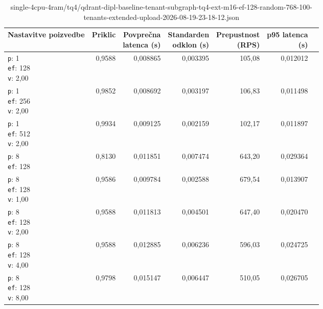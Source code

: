 \begin{table}[htbp]
  \centering
\small
  \caption{single-4cpu-4ram/tq4/qdrant-dipl-baseline-tenant-subgraph-tq4-ext-m16-ef-128-random-768-100-tenants-extended-upload-2026-08-19-23-18-12.json}
  \label{tab:single-4cpu-4ram:tq4:qdrant-dipl-baseline-tenant-subgraph-tq4-ext-m16-ef-128-random-768-100-tenants-extended-upload-2026-08-19-23-18-12.json}
  \begin{tabularx}{\textwidth}{Xrrrrrr}
    \toprule
    Nastavitve poizvedbe & Priklic & \makecell{Povprečna\\latenca (s)} & \makecell{Standarden\\odklon (s)} & \makecell{Prepustnost\\(RPS)} & \makecell{p95 latenca\\(s)}  \\
    \midrule
    \makecell{\texttt{p}: 1\\\texttt{ef}: 128\\\texttt{v}: 2,00} & 0,9588 & 0,008865 & 0,003395 & 105,08 & 0,012012 \\
    \makecell{\texttt{p}: 1\\\texttt{ef}: 256\\\texttt{v}: 2,00} & 0,9852 & 0,008692 & 0,003197 & 106,83 & 0,011498 \\
    \makecell{\texttt{p}: 1\\\texttt{ef}: 512\\\texttt{v}: 2,00} & 0,9934 & 0,009125 & 0,002159 & 102,17 & 0,011897 \\
    \makecell{\texttt{p}: 8\\\texttt{ef}: 128} & 0,8130 & 0,011851 & 0,007474 & 643,20 & 0,029364 \\
    \makecell{\texttt{p}: 8\\\texttt{ef}: 128\\\texttt{v}: 1,00} & 0,9586 & 0,009784 & 0,002588 & 679,54 & 0,013907 \\
    \makecell{\texttt{p}: 8\\\texttt{ef}: 128\\\texttt{v}: 2,00} & 0,9588 & 0,011813 & 0,004501 & 647,40 & 0,020470 \\
    \makecell{\texttt{p}: 8\\\texttt{ef}: 128\\\texttt{v}: 4,00} & 0,9588 & 0,012885 & 0,006236 & 596,03 & 0,024725 \\
    \makecell{\texttt{p}: 8\\\texttt{ef}: 128\\\texttt{v}: 8,00} & 0,9798 & 0,015147 & 0,006447 & 510,05 & 0,026705 \\

\end{tabularx}
\end{table}
